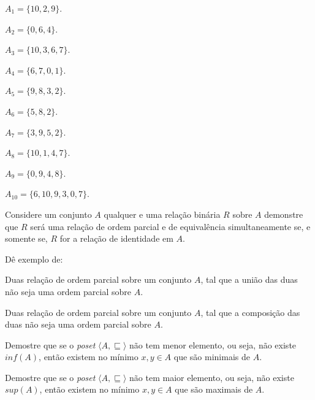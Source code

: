 \begin{exerList}
	\item $A_1 = \{10, 2, 9\}$.
	\item $A_2= \{0, 6, 4\}$.
	\item $A_3 = \{10, 3, 6, 7\}$.
	\item $A_4 = \{6, 7, 0, 1\}$.
	\item $A_5 = \{9, 8, 3, 2\}$.
	\item $A_6 = \{5, 8, 2\}$.
	\item $A_7 = \{3, 9, 5, 2\}$.
	\item $A_8 = \{10, 1, 4, 7\}$.
	\item $A_9 = \{0,  9, 4, 8\}$.
	\item $A_{10} = \{6, 10, 9, 3, 0, 7\}$.
\end{exerList}

\begin{problem}\label{prob:EquivalenciaOrdem19}
	Considere um conjunto $A$ qualquer e uma relação binária $R$ sobre $A$ demonstre que $R$ será uma relação de ordem parcial e de equivalência simultaneamente se, e somente se, $R$ for a relação de identidade em $A$.
\end{problem}

\begin{problem}\label{prob:EquivalenciaOrdem20}
	Dê exemplo de:
\end{problem}

\begin{exerList}
	\item Duas relação de ordem parcial sobre um conjunto $A$, tal que a união das duas não seja uma ordem parcial sobre $A$.
	\item Duas relação de ordem parcial sobre um conjunto $A$, tal que a composição das duas não seja uma ordem parcial sobre $A$.
\end{exerList}

\begin{problem}\label{prob:EquivalenciaOrdem21}
	Demostre que se o \textit{poset} $\langle A, \sqsubseteq \rangle$ não tem menor elemento, ou seja, não existe $inf(A)$, então existem no mínimo $x, y \in A$ que são minimais de $A$.
\end{problem}

\begin{problem}\label{prob:EquivalenciaOrdem22}
	Demostre que se o \textit{poset} $\langle A, \sqsubseteq \rangle$ não tem maior elemento, ou seja, não existe $sup(A)$, então existem no mínimo $x, y \in A$ que são maximais de $A$.
\end{problem}


